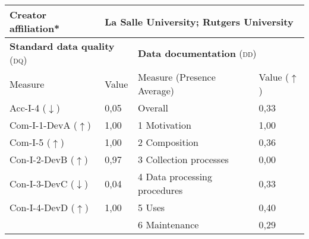 \begin{table}[h]
\begin{tabular}{|p{3cm}|p{1.9cm}p{3cm}p{2.6cm}p{1.6cm}|}
        \textbf{Creator affiliation*} & \multicolumn{4}{l|}{La Salle University; Rutgers University} \\ \hline\hline
        \multicolumn{2}{|l|}{\textbf{Standard data quality} (\textsc{dq})} & \multicolumn{3}{|l|}{\textbf{Data documentation} (\textsc{dd})}\\ \hline
        Measure & Value & \multicolumn{2}{|l|}{Measure (Presence Average)} & Value ($\uparrow$) \\ \hline
        Acc-I-4 ($\downarrow$) & 0,05\cellcolor[HTML]{FEF9F8} & \multicolumn{2}{|l|}{Overall} & 0,33\cellcolor[HTML]{FDB6A0} \\
        Com-I-1-DevA ($\uparrow$) & 1,00\cellcolor[HTML]{FFFFFF} & \multicolumn{2}{|l|}{1 Motivation} & 1,00\cellcolor[HTML]{FFFFFF} \\
        Com-I-5 ($\uparrow$) & 1,00\cellcolor[HTML]{FFFFFF} & \multicolumn{2}{|l|}{2 Composition} & 0,36\cellcolor[HTML]{FDB8A4} \\
        Con-I-2-DevB ($\uparrow$) & 0,97\cellcolor[HTML]{FEFBFA} & \multicolumn{2}{|l|}{3 Collection processes} & 0,00\cellcolor[HTML]{FC9272} \\
        Con-I-3-DevC ($\downarrow$) & 0,04\cellcolor[HTML]{FEFBF9} & \multicolumn{2}{|l|}{4 Data processing procedures} & 0,33\cellcolor[HTML]{FDB6A0} \\
        Con-I-4-DevD ($\uparrow$) & 1,00\cellcolor[HTML]{FFFFFF} & \multicolumn{2}{|l|}{5 Uses} & 0,40\cellcolor[HTML]{FDBDAA} \\ 
         & & \multicolumn{2}{|l|}{6 Maintenance} & 0,29\cellcolor[HTML]{FCB19A} \\ \hline
        
         \hline
    \end{tabular}
\end{table}